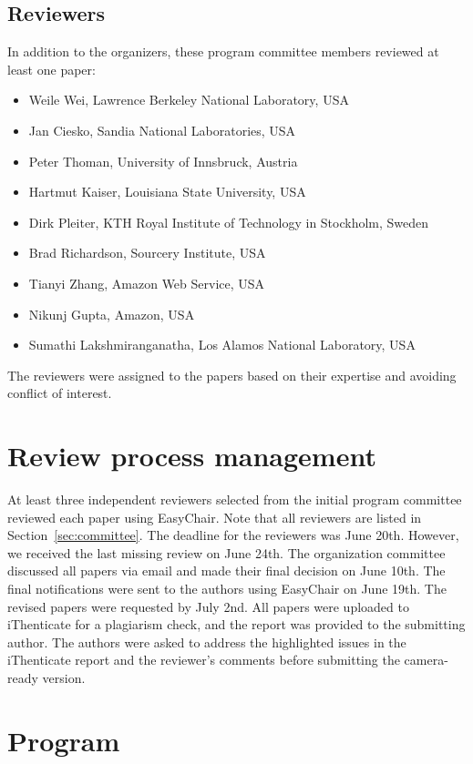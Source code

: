 \documentclass{article}
\begin{document}
\subsection{Reviewers}
In addition to the organizers, these program committee members reviewed at least one paper:
\begin{itemize}
  \item Weile Wei, Lawrence Berkeley National Laboratory, USA
   \item Jan Ciesko, Sandia National Laboratories, USA
    \item Peter Thoman, University of Innsbruck, Austria
     \item Hartmut Kaiser, Louisiana State University, USA
    \item Dirk Pleiter, KTH Royal Institute of Technology in Stockholm, Sweden
    \item Brad Richardson, Sourcery Institute, USA
 \item Tianyi Zhang, Amazon Web Service, USA
 \item Nikunj Gupta, Amazon, USA
  \item Sumathi Lakshmiranganatha, Los Alamos National Laboratory, USA
\end{itemize}
The reviewers were assigned to the papers based on their expertise and avoiding conflict of interest. 


\section{Review process management}
At least three independent reviewers selected from the initial program committee reviewed each paper using EasyChair. Note that all reviewers are listed in Section~\ref{sec:committee}. The deadline for the reviewers was June 20th. However, we received the last missing review on June 24th. The organization committee discussed all papers via email and made their final decision on June 10th. The final notifications were sent to the authors using EasyChair on June 19th. The revised papers were requested by July 2nd. All papers were uploaded to iThenticate for a plagiarism check, and the report was provided to the submitting author. The authors were asked to address the highlighted issues in the iThenticate report and the reviewer’s comments before submitting the camera-ready version. 


\section{Program}
\end{document}
